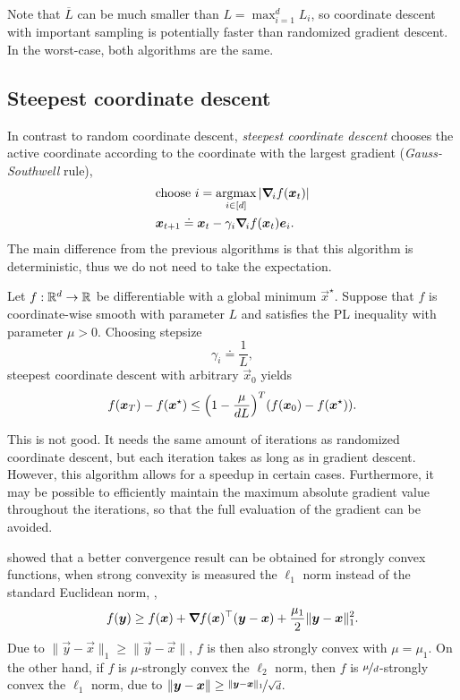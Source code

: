 Note that $\overline{L}$ can be much smaller than $L = \max_{i=1}^d L_i$, so coordinate descent
with important sampling is potentially faster than randomized gradient descent. In the worst-case,
both algorithms are the same.

\subsection{Steepest coordinate descent}

In contrast to random coordinate descent, \textit{steepest coordinate descent} chooses the active
coordinate according to the coordinate with the largest gradient (\textit{Gauss-Southwell} rule),
\begin{align*}
     & \text{choose $i = \argmax_{i \in [d]} | \grad{f(\vec{x}_t)}{i} |$}          \\
     & \vec{x}_{t+1} \doteq \vec{x}_t - \gamma_i \grad{f(\vec{x}_t)}{i} \vec{e}_i.
\end{align*}
The main difference from the previous algorithms is that this algorithm is deterministic, thus we do
not need to take the expectation.

\begin{corollary}
    Let $f: \R^d \to \R$ be differentiable with a global minimum $\vec{x}^\star$. Suppose that $f$ is coordinate-wise smooth with parameter $L$ and satisfies the PL inequality with parameter $\mu > 0$. Choosing stepsize \[
        \gamma_i \doteq \frac{1}{L},
    \]
    steepest coordinate descent with arbitrary $\vec{x}_0$ yields \[
        f(\vec{x}_T) - f(\vec{x}^\star) \leq \lft( 1 - \frac{\mu}{dL} \rgt)^T (f(\vec{x}_0) - f(\vec{x}^\star)).
    \]
\end{corollary}

This is not good. It needs the same amount of iterations as randomized coordinate descent, but each
iteration takes as long as in gradient descent. However, this algorithm allows for a
speedup in certain cases. Furthermore, it may be possible to efficiently maintain the maximum
absolute gradient value throughout the iterations, so that the full evaluation of the gradient can
be avoided.

\cite{nutini2015coordinate} showed that a better convergence result can be obtained for strongly convex functions, when strong convexity is measured \wrt the $\ell_1$ norm instead of the standard Euclidean norm, \ie, \[
    f(\vec{y}) \geq f(\vec{x}) + \transpose{\grad{f(\vec{x})}{}} (\vec{y}-\vec{x}) + \frac{\mu_1}{2} \|\vec{y} - \vec{x}\|_1^2.
\]
Due to $\| \vec{y} - \vec{x} \|_1 \geq \| \vec{y} - \vec{x} \|$, $f$ is then also strongly convex
with $\mu = \mu_1$. On the other hand, if $f$ is $\mu$-strongly convex \wrt the $\ell_2$ norm, then
$f$ is $\nicefrac{\mu}{d}$-strongly convex \wrt the $\ell_1$ norm, due to $\|\vec{y}-\vec{x}\| \geq
    \nicefrac{\|\vec{y}-\vec{x}\|_1}{\sqrt{d}}$.

